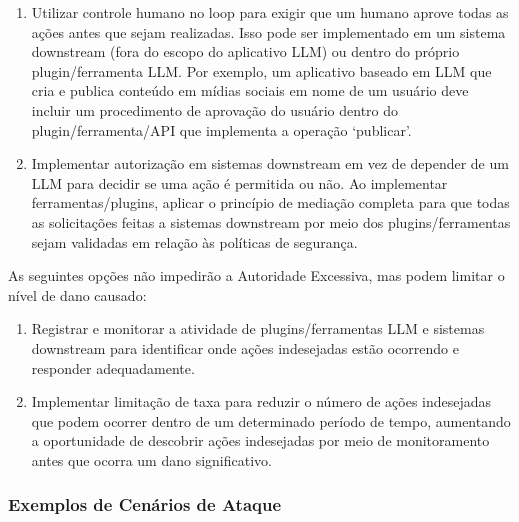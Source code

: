 \documentclass[
]{article}
\providecommand{\tightlist}{%
  \setlength{\itemsep}{0pt}\setlength{\parskip}{0pt}}
\begin{document}
\begin{enumerate}
\item
  Utilizar controle humano no loop para exigir que um humano aprove
  todas as ações antes que sejam realizadas. Isso pode ser implementado
  em um sistema downstream (fora do escopo do aplicativo LLM) ou dentro
  do próprio plugin/ferramenta LLM. Por exemplo, um aplicativo baseado
  em LLM que cria e publica conteúdo em mídias sociais em nome de um
  usuário deve incluir um procedimento de aprovação do usuário dentro do
  plugin/ferramenta/API que implementa a operação `publicar'.
\item
  Implementar autorização em sistemas downstream em vez de depender de
  um LLM para decidir se uma ação é permitida ou não. Ao implementar
  ferramentas/plugins, aplicar o princípio de mediação completa para que
  todas as solicitações feitas a sistemas downstream por meio dos
  plugins/ferramentas sejam validadas em relação às políticas de
  segurança.
\end{enumerate}

As seguintes opções não impedirão a Autoridade Excessiva, mas podem
limitar o nível de dano causado:

\begin{enumerate}
\def\labelenumi{\arabic{enumi}.}
\tightlist
\item
  Registrar e monitorar a atividade de plugins/ferramentas LLM e
  sistemas downstream para identificar onde ações indesejadas estão
  ocorrendo e responder adequadamente.
\item
  Implementar limitação de taxa para reduzir o número de ações
  indesejadas que podem ocorrer dentro de um determinado período de
  tempo, aumentando a oportunidade de descobrir ações indesejadas por
  meio de monitoramento antes que ocorra um dano significativo.
\end{enumerate}

\subsubsection{Exemplos de Cenários de
Ataque}\label{exemplos-de-cenuxe1rios-de-ataque}
\end{document}

